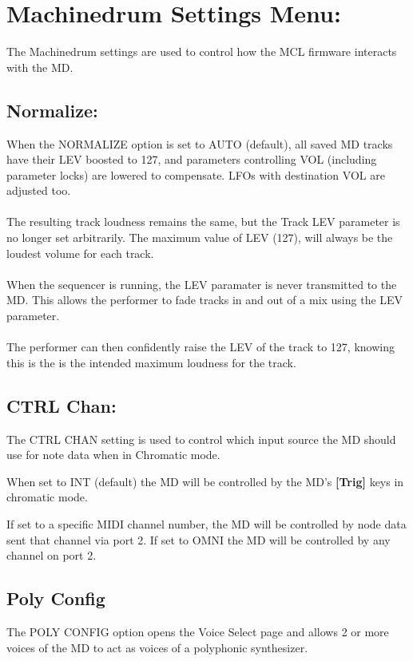 \chapter{Machinedrum Settings Menu:}
The Machinedrum settings are used to control how the MCL firmware interacts with the MD.
\section{Normalize:}

When the NORMALIZE option is set to AUTO (default), all saved MD tracks have their LEV boosted to 127, and parameters controlling VOL (including parameter locks) are lowered
to compensate. LFOs with destination VOL are 
adjusted too.\\
\\
The resulting track loudness remains the same, but the Track LEV parameter is no longer set arbitrarily. The maximum value of LEV (127), will always be the loudest volume for each track.\\
\\
When the sequencer is running, the LEV paramater is never transmitted to the MD. This allows the performer to fade tracks in and out of a mix using the LEV parameter.\\
\\
The performer can then confidently raise the LEV of the track to 127, knowing this is the is the intended maximum loudness for the track.
\section{CTRL Chan:}
The CTRL CHAN setting is used to control which input  source the MD should use for note data when in Chromatic mode.

When set to INT (default) the MD will be controlled by the MD's \textbf{[Trig]} keys in chromatic mode.

If set to a specific MIDI channel number, the MD will be controlled by node data sent that channel via port 2. If set to OMNI the MD will be controlled by any channel on port 2.
\section{Poly Config}
The POLY CONFIG option opens the Voice Select page and allows 2 or more voices of the MD to act as voices of a polyphonic synthesizer.